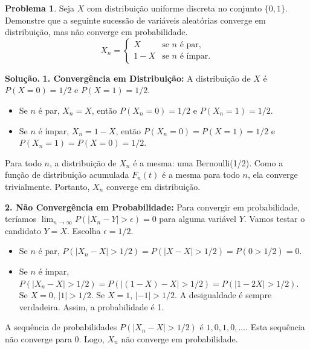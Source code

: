\documentclass{article}
\theoremstyle{definition}
\newtheorem{problema}{Problema}
\newenvironment{solucao}{\par\noindent\textbf{Solução.}}{\par}
\begin{document}
	\hrulefill
	
	\begin{problema}{}
		Seja $X$ com distribuição uniforme discreta no conjunto $\{0, 1\}$. Demonstre que a seguinte sucessão de variáveis aleatórias converge em distribuição, mas não converge em probabilidade.
		\[
		X_n = \begin{cases} 
			X & \text{se } n \text{ é par,} \\
			1-X & \text{se } n \text{ é ímpar.}
		\end{cases}
		\]
	\end{problema}
	
	\begin{solucao}
		\textbf{1. Convergência em Distribuição:}
		A distribuição de $X$ é $P(X=0)=1/2$ e $P(X=1)=1/2$.
		\begin{itemize}
			\item Se $n$ é par, $X_n=X$, então $P(X_n=0)=1/2$ e $P(X_n=1)=1/2$.
			\item Se $n$ é ímpar, $X_n=1-X$, então $P(X_n=0)=P(X=1)=1/2$ e $P(X_n=1)=P(X=0)=1/2$.
		\end{itemize}
		Para todo $n$, a distribuição de $X_n$ é a mesma: uma Bernoulli(1/2). Como a função de distribuição acumulada $F_n(t)$ é a mesma para todo $n$, ela converge trivialmente. Portanto, $X_n$ converge em distribuição.
		
		\textbf{2. Não Convergência em Probabilidade:}
		Para convergir em probabilidade, teríamos $\lim_{n \to \infty} P(|X_n - Y| > \epsilon) = 0$ para alguma variável $Y$. Vamos testar o candidato $Y=X$. Escolha $\epsilon=1/2$.
		\begin{itemize}
			\item Se $n$ é par, $P(|X_n - X| > 1/2) = P(|X - X| > 1/2) = P(0 > 1/2) = 0$.
			\item Se $n$ é ímpar, $P(|X_n - X| > 1/2) = P(|(1-X) - X| > 1/2) = P(|1 - 2X| > 1/2)$.
			Se $X=0$, $|1|>1/2$. Se $X=1$, $|-1|>1/2$. A desigualdade é sempre verdadeira. Assim, a probabilidade é 1.
		\end{itemize}
		A sequência de probabilidades $P(|X_n - X| > 1/2)$ é $1, 0, 1, 0, \ldots$. Esta sequência não converge para 0. Logo, $X_n$ não converge em probabilidade.
	\end{solucao}
	
\end{document}
